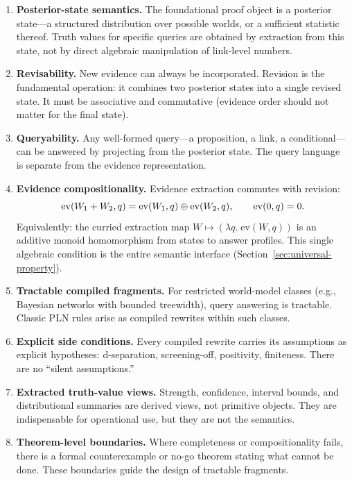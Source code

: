 \documentclass[11pt,openany]{report}
\begin{document}
\begin{enumerate}
\item \textbf{Posterior-state semantics.}  The foundational proof object is a
  posterior state---a structured distribution over possible worlds, or a
  sufficient statistic thereof.  Truth values for specific queries are
  obtained by extraction from this state, not by direct algebraic manipulation
  of link-level numbers.

\item \textbf{Revisability.}  New evidence can always be incorporated.
  Revision is the fundamental operation: it combines two posterior states
  into a single revised state.  It must be associative and commutative
  (evidence order should not matter for the final state).

\item \textbf{Queryability.}  Any well-formed query---a proposition, a link,
  a conditional---can be answered by projecting from the posterior state.
  The query language is separate from the evidence representation.

\item \textbf{Evidence compositionality.}  Evidence extraction commutes with
  revision:
  \[
    \mathrm{ev}(W_1 + W_2, q) = \mathrm{ev}(W_1, q) \oplus
    \mathrm{ev}(W_2, q), \qquad \mathrm{ev}(0, q) = 0.
  \]
  Equivalently: the curried extraction map
  $W \mapsto (\lambda q.\;\mathrm{ev}(W,q))$ is an additive monoid
  homomorphism from states to answer profiles.  This single algebraic
  condition is the entire semantic interface
  (Section~\ref{sec:universal-property}).

\item \textbf{Tractable compiled fragments.}  For restricted world-model
  classes (e.g., Bayesian networks with bounded treewidth), query answering
  is tractable.  Classic PLN rules arise as compiled rewrites within such
  classes.

\item \textbf{Explicit side conditions.}  Every compiled rewrite carries its
  assumptions as explicit hypotheses: d-separation, screening-off, positivity,
  finiteness.  There are no ``silent assumptions.''

\item \textbf{Extracted truth-value views.}  Strength, confidence, interval
  bounds, and distributional summaries are derived views, not primitive
  objects.  They are indispensable for operational use, but they are not the
  semantics.

\item \textbf{Theorem-level boundaries.}  Where completeness or compositionality
  fails, there is a formal counterexample or no-go theorem stating what
  cannot be done.  These boundaries guide the design of tractable fragments.
\end{enumerate}
\end{document}
